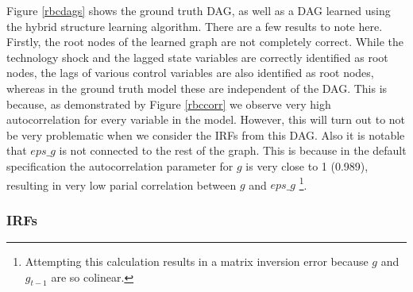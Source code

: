 \documentclass{article}
\begin{document}
Figure \ref{rbcdags} shows the ground truth DAG, as well as a DAG learned using the hybrid structure learning algorithm. There are a few results to note here. Firstly, the root nodes of the learned graph are not completely correct. While the technology shock and the lagged state variables are correctly identified as root nodes, the lags of various control variables are also identified as root nodes, whereas in the ground truth model these are independent of the DAG. This is because, as demonstrated by Figure \ref{rbccorr} we observe very high autocorrelation for every variable in the model. However, this will turn out to not be very problematic when we consider the IRFs from this DAG. Also it is notable that $eps\_g$ is not connected to the rest of the graph. This is because in the default specification the autocorrelation parameter for $g$ is very close to 1 (0.989), resulting in very low parial correlation between $g$ and $eps\_g$ \footnote{Attempting this calculation results in a matrix inversion error because $g$ and $g_{t-1}$ are so colinear.}.

\subsubsection{IRFs}
\end{document}
